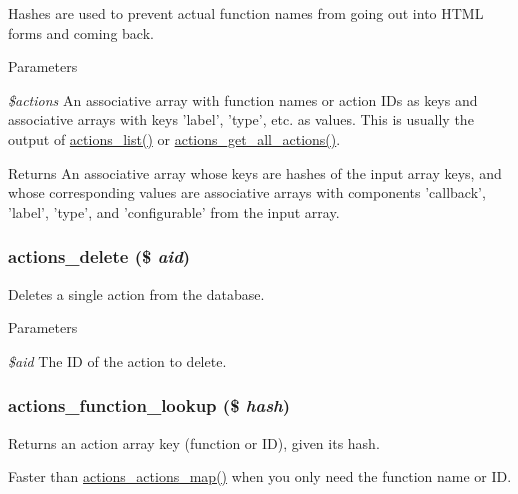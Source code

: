 Hashes are used to prevent actual function names from going out into HTML forms and coming back.


\begin{DoxyParams}{Parameters}
\item[{\em \$actions}]An associative array with function names or action IDs as keys and associative arrays with keys 'label', 'type', etc. as values. This is usually the output of \hyperlink{actions_8inc_ad0dbf276d4ca1834760cffc7e1b1be53}{actions\_\-list()} or \hyperlink{actions_8inc_a4275e9fee609ba6e85b03278a681436c}{actions\_\-get\_\-all\_\-actions()}.\end{DoxyParams}
\begin{DoxyReturn}{Returns}
An associative array whose keys are hashes of the input array keys, and whose corresponding values are associative arrays with components 'callback', 'label', 'type', and 'configurable' from the input array. 
\end{DoxyReturn}
\hypertarget{actions_8inc_a857468911c3dd6f839cbdb14c6ed80ac}{
\subsubsection[{actions\_\-delete}]{\setlength{\rightskip}{0pt plus 5cm}actions\_\-delete (\$ {\em aid})}}
\label{actions_8inc_a857468911c3dd6f839cbdb14c6ed80ac}
Deletes a single action from the database.


\begin{DoxyParams}{Parameters}
\item[{\em \$aid}]The ID of the action to delete. \end{DoxyParams}
\hypertarget{actions_8inc_a4a0e35c01b48d1a413889948c061a6f0}{
\subsubsection[{actions\_\-function\_\-lookup}]{\setlength{\rightskip}{0pt plus 5cm}actions\_\-function\_\-lookup (\$ {\em hash})}}
\label{actions_8inc_a4a0e35c01b48d1a413889948c061a6f0}
Returns an action array key (function or ID), given its hash.

Faster than \hyperlink{actions_8inc_ad943b3f497c80809d895ecc01490d10f}{actions\_\-actions\_\-map()} when you only need the function name or ID.


